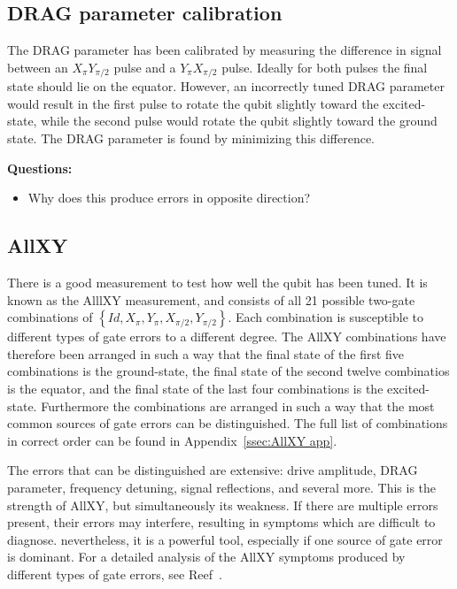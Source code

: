       \subsection{DRAG parameter calibration}
        \label{ssec:DRAG parameter calibration}
        The DRAG parameter has been calibrated by measuring the difference in signal between an $X_{\pi} Y_{\pi/2}$ pulse and a $Y_{\pi} X_{\pi/2}$ pulse. Ideally for both pulses the final state should lie on the equator. However, an incorrectly tuned DRAG parameter would result in the first pulse to rotate the qubit slightly toward the excited-state, while the second pulse would rotate the qubit slightly toward the ground state. The DRAG parameter is found by minimizing this difference.

        \textbf{Questions:}
        \begin{itemize}
          \item Why does this produce errors in opposite direction?
        \end{itemize}

      \subsection{AllXY}
        \label{ssec:AllXY}
        There is a good measurement to test how well the qubit has been tuned. It is known as the AlllXY measurement, and consists of all 21 possible two-gate combinations of $\left\{Id, X_{\pi}, Y_{\pi}, X_{\pi/2}, Y_{\pi/2}\right\}$. Each combination is susceptible to different types of gate errors to a different degree. The AllXY combinations have therefore been arranged in such a way that the final state of the first five combinations is the ground-state, the final state of the second twelve combinatios is the equator, and the final state of the last four combinations is the excited-state. Furthermore the combinations are arranged in such a way that the most common sources of gate errors can be distinguished. The full list of combinations in correct order can be found in Appendix~\ref{ssec:AllXY app}.

        The errors that can be distinguished are extensive: drive amplitude, DRAG parameter, frequency detuning, signal reflections, and several more. This is the strength of AllXY, but simultaneously its weakness. If there are multiple errors present, their errors may interfere, resulting in symptoms which are difficult to diagnose. nevertheless, it is a powerful tool, especially if one source of gate error is dominant. For a detailed analysis of the AllXY symptoms produced by different types of gate errors, see Reef~\cite{Reed}.


